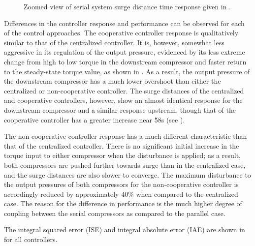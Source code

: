 \begin{figure}
  \resizebox{\linewidth}{!}{%
    
  }
  \caption[Zoomed view of surge distance time response of serial system.]{Zoomed view of serial system surge distance time response given in .}
  \label{fig:res:serial-sd-zoom}
\end{figure}

Differences in the controller response and performance can be observed for each of the control approaches.
The cooperative controller response is qualitatively similar to that of the centralized controller.
It is, however, somewhat less aggressive in its regulation of the output pressure, evidenced by its less extreme change from high to low torque in the downstream compressor and faster return to the steady-state torque value, as shown in .
As a result, the output pressure of the downstream compressor has a much lower overshoot than either the centralized or non-cooperative controller.
The surge distances of the centralized and cooperative controllers, however, show an almost identical response for the downstream compressor and a similar response upstream, though that of the cooperative controller has a greater increase near \u{58}{s} (see ).

The non-cooperative controller response has a much different characteristic than that of the centralized controller.
There is no significant initial increase in the torque input to either compressor when the disturbance is applied; as a result, both compressors are pushed further towards surge than in the centralized case, and the surge distances are also slower to converge.
The maximum disturbance to the output pressures of both compressors for the non-cooperative controller is accordingly reduced by approximately 40\% when compared to the centralized case.
The reason for the difference in performance is the much higher degree of coupling between the serial compressors as compared to the parallel case.

The integral squared error (ISE) and integral absolute error (IAE) are shown in  for all controllers.

